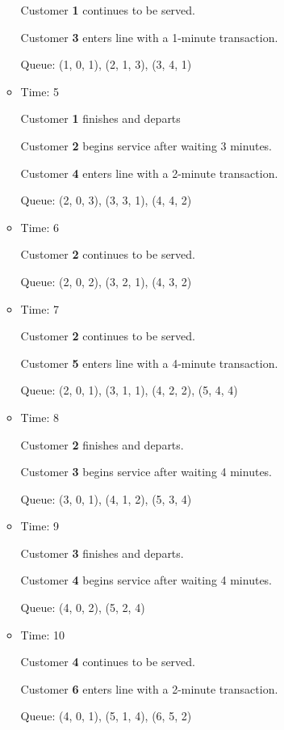 \documentclass[10pt]{article}
\begin{document}
\begin{enumerate}
\begin{itemize}
					Customer \textbf{1} continues to be served.
					
					Customer \textbf{3} enters line with a 1-minute transaction.
					
					Queue: (1, 0, 1), (2, 1, 3), (3, 4, 1)
				
				\item Time: 5
					
					Customer \textbf{1} finishes and departs
					
					Customer \textbf{2} begins service after waiting 3 minutes.
					
					Customer \textbf{4} enters line with a 2-minute transaction.
					
					Queue: (2, 0, 3), (3, 3, 1), (4, 4, 2)
				
				\item Time: 6
					
					Customer \textbf{2} continues to be served.
					
					Queue: (2, 0, 2), (3, 2, 1), (4, 3, 2)
				
				\item Time: 7
					
					Customer \textbf{2} continues to be served.
					
					Customer \textbf{5} enters line with a 4-minute transaction.
					
					Queue: (2, 0, 1), (3, 1, 1), (4, 2, 2), (5, 4, 4)
				
				\item Time: 8
					
					Customer \textbf{2} finishes and departs.
					
					Customer \textbf{3} begins service after waiting 4 minutes.
					
					Queue: (3, 0, 1), (4, 1, 2), (5, 3, 4)
				
				\item Time: 9
					
					Customer \textbf{3} finishes and departs.
					
					Customer \textbf{4} begins service after waiting 4 minutes.
					
					Queue: (4, 0, 2), (5, 2, 4)
				
				\item Time: 10
					
					Customer \textbf{4} continues to be served.
					
					Customer \textbf{6} enters line with a 2-minute transaction.
					
					Queue: (4, 0, 1), (5, 1, 4), (6, 5, 2)
				

\end{itemize}
\end{enumerate}
\end{document}
